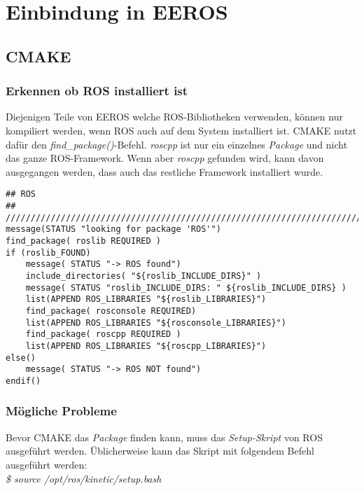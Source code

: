 \chapter{Einbindung in EEROS}


\section{CMAKE}
\subsection{Erkennen ob ROS installiert ist}
Diejenigen Teile von EEROS welche ROS-Bibliotheken verwenden, können nur kompiliert werden, wenn ROS auch auf dem System installiert ist.
CMAKE nutzt dafür den \textit{find\_package()}-Befehl.
\textit{roscpp} ist nur ein  einzelnes \textit{Package} und nicht das ganze ROS-Framework.
Wenn aber \textit{roscpp} gefunden wird, kann davon ausgegangen werden, dass auch das restliche Framework installiert wurde.

\lstset{language=c}
\begin{lstlisting}
## ROS	
## ////////////////////////////////////////////////////////////////////////
message(STATUS "looking for package 'ROS'")
find_package( roslib REQUIRED )
if (roslib_FOUND)
	message( STATUS "-> ROS found")
	include_directories( "${roslib_INCLUDE_DIRS}" )
	message( STATUS "roslib_INCLUDE_DIRS: " ${roslib_INCLUDE_DIRS} )
	list(APPEND ROS_LIBRARIES "${roslib_LIBRARIES}")
	find_package( rosconsole REQUIRED)
	list(APPEND ROS_LIBRARIES "${rosconsole_LIBRARIES}")
	find_package( roscpp REQUIRED )
	list(APPEND ROS_LIBRARIES "${roscpp_LIBRARIES}")
else()
	message( STATUS "-> ROS NOT found")
endif()
\end{lstlisting}

\subsection{Mögliche Probleme}
Bevor CMAKE das \textit{Package} finden kann, muss das \textit{Setup-Skript} von ROS ausgeführt werden.
Üblicherweise kann das Skript mit folgendem Befehl ausgeführt werden:\\
\textit{\$ source /opt/ros/kinetic/setup.bash}

